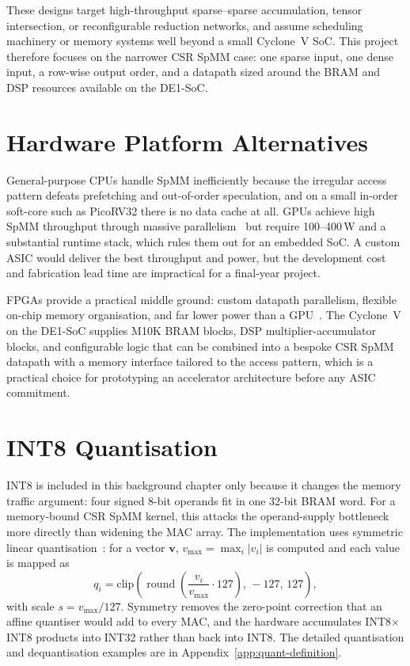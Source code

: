 These designs target high-throughput sparse--sparse accumulation, tensor
intersection, or reconfigurable reduction networks, and assume scheduling
machinery or memory systems well beyond a small Cyclone~V SoC. This project
therefore focuses on the narrower CSR SpMM case: one sparse input, one dense
input, a row-wise output order, and a datapath sized around the BRAM and DSP
resources available on the DE1-SoC.

\section{Hardware Platform Alternatives}

General-purpose CPUs handle SpMM inefficiently because the irregular access
pattern defeats prefetching and out-of-order speculation, and on a small
in-order soft-core such as PicoRV32 there is no data cache at all. GPUs
achieve high SpMM throughput through massive parallelism~\citep{bell_garland2009}
but require 100--400\,W and a substantial runtime stack, which rules them
out for an embedded SoC. A custom ASIC would deliver the best throughput
and power, but the development cost and fabrication lead time are
impractical for a final-year project.

FPGAs provide a practical middle ground: custom datapath parallelism,
flexible on-chip memory organisation, and far lower power than a
GPU~\citep{nurvitadhi2017}. The Cyclone~V on the DE1-SoC supplies M10K
BRAM blocks, DSP multiplier-accumulator blocks, and configurable logic
that can be combined into a bespoke CSR SpMM datapath with a memory
interface tailored to the access pattern, which is a practical choice
for prototyping an accelerator architecture before any ASIC commitment.

\vspace{2cm}

\section{INT8 Quantisation}
\label{sec:int8-background}

INT8 is included in this background chapter only because it changes the memory
traffic argument: four signed 8-bit operands fit in one 32-bit BRAM word. For a
memory-bound CSR SpMM kernel, this attacks the operand-supply bottleneck more
directly than widening the MAC array. The implementation uses symmetric linear
quantisation~\citep{jacob2018, nagel2021}: for a vector $\mathbf{v}$,
$v_{\max} = \max_i |v_i|$ is computed and each value is mapped as
\begin{equation}
  q_i = \mathrm{clip}\!\left(\operatorname{round}\!\left(
          \frac{v_i}{v_{\max}} \cdot 127 \right),\,-127,\,127\right),
  \label{eq:quant}
\end{equation}
with scale $s = v_{\max}/127$. Symmetry removes the zero-point correction that
an affine quantiser would add to every MAC, and the hardware accumulates
INT8$\times$INT8 products into INT32 rather than back into INT8. The detailed
quantisation and dequantisation examples are in
Appendix~\ref{app:quant-definition}.

